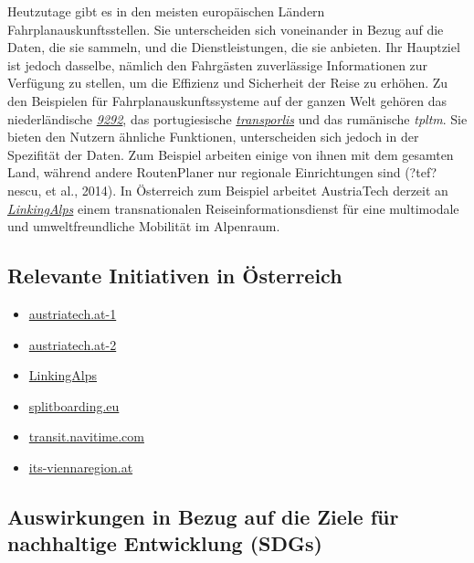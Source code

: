 \documentclass[
]{book}
\providecommand{\tightlist}{%
  \setlength{\itemsep}{0pt}\setlength{\parskip}{0pt}}
\begin{document}
Heutzutage gibt es in den meisten europäischen Ländern Fahrplanauskunftsstellen. Sie unterscheiden sich voneinander in Bezug auf die Daten, die sie sammeln, und die Dienstleistungen, die sie anbieten. Ihr Hauptziel ist jedoch dasselbe, nämlich den Fahrgästen zuverlässige Informationen zur Verfügung zu stellen, um die Effizienz und Sicherheit der Reise zu erhöhen. Zu den Beispielen für Fahrplanauskunftssysteme auf der ganzen Welt gehören das niederländische \href{https://9292.nl/en}{\emph{9292}}, das portugiesische \href{https://www.transporlis.pt/Default.aspx?tabid=36}{\emph{transporlis}} und das rumänische \emph{tpltm}. Sie bieten den Nutzern ähnliche Funktionen, unterscheiden sich jedoch in der Spezifität der Daten. Zum Beispiel arbeiten einige von ihnen mit dem gesamten Land, während andere RoutenPlaner nur regionale Einrichtungen sind (?tef?nescu, et al., 2014). In Österreich zum Beispiel arbeitet AustriaTech derzeit an \href{https://www.austriatech.at/en/projects//showprojekt/38/LinkingAlps}{\emph{LinkingAlps}} einem transnationalen Reiseinformationsdienst für eine multimodale und umweltfreundliche Mobilität im Alpenraum.

\hypertarget{relevante-initiativen-in-uxf6sterreich-20}{%
\subsection*{Relevante Initiativen in Österreich}\label{relevante-initiativen-in-uxf6sterreich-20}}

\begin{itemize}
\tightlist
\item
  \href{https://www.austriatech.at/de/grenzueberschreitende-reiseplanung-auf-dem-vormarsch/}{austriatech.at-1}
\item
  \href{https://www.austriatech.at/en/projects//showprojekt/38/LinkingAlps}{austriatech.at-2}
\item
  \href{https://www.alpine-space.eu/projects/linkingalps/en/home}{LinkingAlps}
\item
  \href{https://www.splitboarding.eu/en/splitboard-routes/ski-route-planner}{splitboarding.eu}
\item
  \href{https://transit.navitime.com/en/at/}{transit.navitime.com}
\item
  \href{https://www.its-viennaregion.at/en/products.html}{its-viennaregion.at}
\end{itemize}

\hypertarget{auswirkungen-in-bezug-auf-die-ziele-fuxfcr-nachhaltige-entwicklung-sdgs-20}{%
\subsection*{Auswirkungen in Bezug auf die Ziele für nachhaltige Entwicklung (SDGs)}\label{auswirkungen-in-bezug-auf-die-ziele-fuxfcr-nachhaltige-entwicklung-sdgs-20}}
\end{document}

